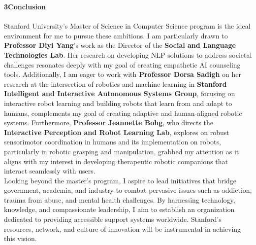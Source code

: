 \documentclass{article}
\begin{document}
\Large\textbf{3\hspace{1em}Conclusion}\normalsize
\\
\\
Stanford University's Master of Science in Computer Science program is the ideal environment for me to pursue these ambitions. I am particularly drawn to \textbf{Professor Diyi Yang}'s work as the Director of the \textbf{Social and Language Technologies Lab}. Her research on developing NLP solutions to address societal challenges resonates deeply with my goal of creating empathetic AI counseling tools. Additionally, I am eager to work with \textbf{Professor Dorsa Sadigh} on her research at the intersection of robotics and machine learning in \textbf{Stanford Intelligent and Interactive Autonomous Systems Group}, focusing on interactive robot learning and building robots that learn from and adapt to humans, complements my goal of creating adaptive and human-aligned robotic systems. Furthermore, \textbf{Professor Jeannette Bohg}, who directs the \textbf{Interactive Perception and Robot Learning Lab}, explores on robust sensorimotor coordination in humans and its implementation on robots, particularly in robotic grasping and manipulation, grabbed my attention as it aligns with my interest in developing therapeutic robotic companions that interact seamlessly with users. 
\\

Looking beyond the master's program, I aspire to lead initiatives that bridge government, academia, and industry to combat pervasive issues such as addiction, trauma from abuse, and mental health challenges. By harnessing technology, knowledge, and compassionate leadership, I aim to establish an organization dedicated to providing accessible support systems worldwide. Stanford’s resources, network, and culture of innovation will be instrumental in achieving this vision.
\end{document}

